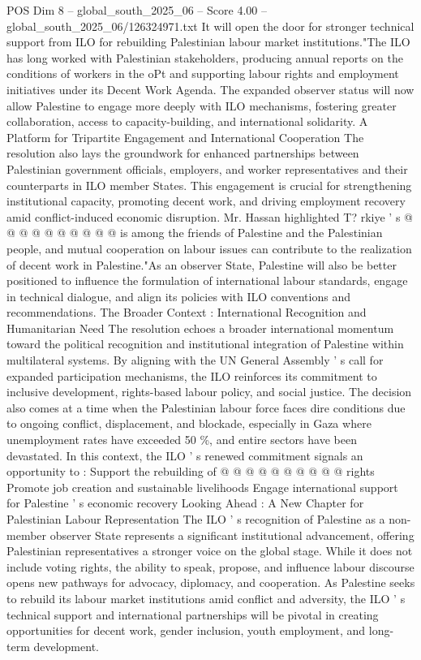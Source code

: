 \begin{textsample}{POS Dim 8 – global\_south\_2025\_06 – Score 4.00 – global\_south\_2025\_06/126324971.txt}
It will open the door for stronger technical support from ILO for rebuilding Palestinian labour market institutions."The ILO has long worked with Palestinian stakeholders, producing annual reports on the conditions of workers in the oPt and supporting labour rights and employment initiatives under its Decent Work Agenda.
The expanded observer status will now allow Palestine to engage more deeply with ILO mechanisms, fostering greater collaboration, access to capacity-building, and international solidarity.
A Platform for Tripartite Engagement and International Cooperation The resolution also lays the groundwork for enhanced partnerships between Palestinian government officials, employers, and worker representatives and their counterparts in ILO member States.
This engagement is crucial for strengthening institutional capacity, promoting decent work, and driving employment recovery amid conflict-induced economic disruption.
Mr.
Hassan highlighted T? rkiye ' s @ @ @ @ @ @ @ @ @ @ is among the friends of Palestine and the Palestinian people, and mutual cooperation on labour issues can contribute to the realization of decent work in Palestine."As an observer State, Palestine will also be better positioned to influence the formulation of international labour standards, engage in technical dialogue, and align its policies with ILO conventions and recommendations.
The Broader Context : International Recognition and Humanitarian Need The resolution echoes a broader international momentum toward the political recognition and institutional integration of Palestine within multilateral systems.
By aligning with the UN General Assembly ' s call for expanded participation mechanisms, the ILO reinforces its commitment to inclusive development, rights-based labour policy, and social justice.
The decision also comes at a time when the Palestinian labour force faces dire conditions due to ongoing conflict, displacement, and blockade, especially in Gaza where unemployment rates have exceeded 50 \%, and entire sectors have been devastated.
In this context, the ILO ' s renewed commitment signals an opportunity to : Support the rebuilding of @ @ @ @ @ @ @ @ @ @ rights Promote job creation and sustainable livelihoods Engage international support for Palestine ' s economic recovery Looking Ahead : A New Chapter for Palestinian Labour Representation The ILO ' s recognition of Palestine as a non-member observer State represents a significant institutional advancement, offering Palestinian representatives a stronger voice on the global stage.
While it does not include voting rights, the ability to speak, propose, and influence labour discourse opens new pathways for advocacy, diplomacy, and cooperation.
As Palestine seeks to rebuild its labour market institutions amid conflict and adversity, the ILO ' s technical support and international partnerships will be pivotal in creating opportunities for decent work, gender inclusion, youth employment, and long-term development.

\end{textsample}
